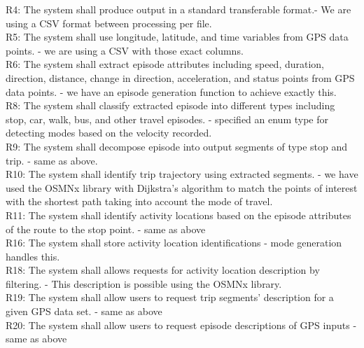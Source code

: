 \documentclass[12pt, titlepage]{article}
\begin{document}
\noindent R4: The system shall produce output in a standard transferable format.- We are using a CSV format between processing per file.\\

\noindent R5: The system shall use longitude, latitude, and time variables from GPS data points. - we are using a CSV with those exact columns. \\

\noindent R6: The system shall extract episode attributes including speed, duration, direction, distance, change in direction, acceleration, and status points from GPS data points. - we have an episode generation function to achieve exactly this.\\

\noindent R8: The system shall classify extracted episode into different types including stop, car, walk, bus, and other travel episodes. - specified an enum type for detecting modes based on the velocity recorded.\\

\noindent R9: The system shall decompose episode into output segments of type stop and trip. - same as above.\\

\noindent R10: The system shall identify trip trajectory using extracted segments. - we have used the OSMNx library with Dijkstra's algorithm to match the points of interest with the shortest path taking into account the mode of travel.\\

\noindent R11: The system shall identify activity locations based on the episode attributes of the route to the stop point. - same as above\\

\noindent R16: The system shall store activity location identifications - mode generation handles this.\\

\noindent R18: The system shall allows requests for activity location description by filtering. - This description is possible using the OSMNx library.\\

\noindent R19: The system shall allow users to request trip segments’ description for a given GPS data set. - same as above\\

\noindent R20: The system shall allow users to request episode descriptions of GPS inputs - same as above \\
\end{document}
